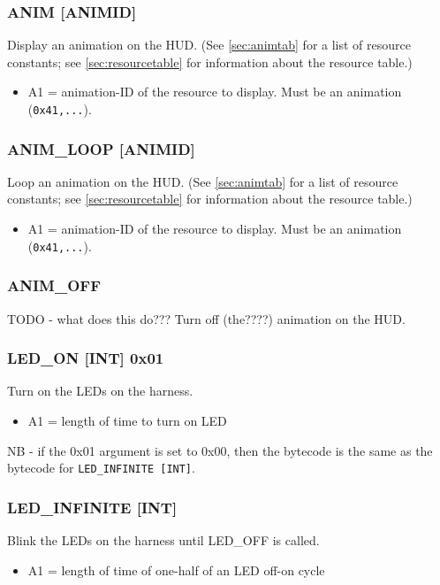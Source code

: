 \documentclass[12pt,a4paper]{scrbook}
\begin{document}
\subsubsection{ANIM [ANIMID]}
Display an animation on the HUD.  (See \ref{sec:animtab} for a list of resource constants;
see \ref{sec:resourcetable} for information about the resource table.)
\begin{itemize}
\item A1 = animation-ID of the resource to display.  Must be an animation (\texttt{0x41,...}).
\end{itemize}

\subsubsection{ANIM\_LOOP [ANIMID]}
Loop an animation on the HUD.  (See \ref{sec:animtab} for a list of resource constants;
see \ref{sec:resourcetable} for information about the resource table.)
\begin{itemize}
\item A1 = animation-ID of the resource to display.  Must be an animation (\texttt{0x41,...}).
\end{itemize}


\subsubsection{ANIM\_OFF}
TODO - what does this do???
Turn off (the????) animation on the HUD.

\subsubsection{LED\_ON [INT] 0x01}
Turn on the LEDs on the harness.
\begin{itemize}
\item A1 = length of time to turn on LED
\end{itemize}
NB - if the 0x01 argument is set to 0x00, then the bytecode is the same as the bytecode for 
\texttt{LED\_INFINITE [INT]}.

\subsubsection{LED\_INFINITE [INT]}
Blink the LEDs on the harness until LED\_OFF is called.
\begin{itemize}
\item A1 = length of time of one-half of an LED off-on cycle
\end{itemize}
\end{document}
